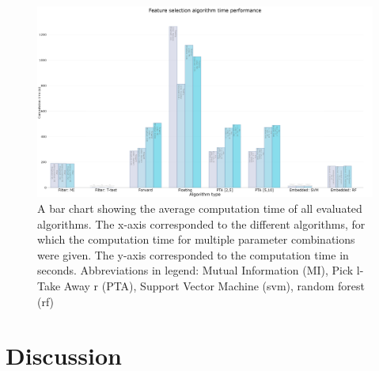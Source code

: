 \documentclass[10pt,a4paper]{article}
\begin{document}
\begin{figure}[H]
	\centering
	\includegraphics[angle=90,height=1.4\textwidth]{ComputationTimeBarChart.png}
	\caption{A bar chart showing the average computation time of all evaluated algorithms. The x-axis corresponded to the different algorithms, for which the computation time for multiple parameter combinations were given. The y-axis corresponded to the computation time in seconds. Abbreviations in legend: Mutual Information (MI), Pick l-Take Away r (PTA), Support Vector Machine (svm), random forest (rf)}
	\label{fig:Comp_Time_Bar}
\end{figure}
	
	\section{Discussion}
	\label{sec:Discussion}
	
\end{document}
